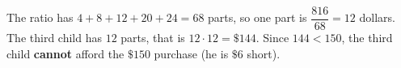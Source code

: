 The ratio has $4+8+12+20+24=68$ parts, so one part is $\dfrac{816}{68}=12$ dollars. The third child has $12$ parts, that is $12\cdot12=\boxed{\$144}$. Since $144<150$, the third child \textbf{cannot} afford the $\$150$ purchase (he is $\$6$ short).
